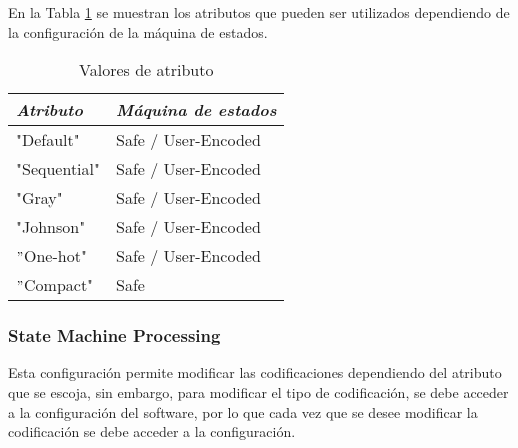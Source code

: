 \documentclass{article}
\begin{document}
En la Tabla \ref{tab:Attribute_Value} se muestran los atributos que pueden ser utilizados dependiendo de la configuración de la máquina de estados.
\begin{table}[h]
    \centering
    \begin{tabular}{|>{\centering\arraybackslash}p{4cm}|>{\centering\arraybackslash}p{4cm}|}
        \hline
        \rule{0pt}{3ex}\textbf{\textit{Atributo}} & \textbf{\textit{Máquina de estados}} \\ \hline
        \rule{0pt}{3 ex}"Default" & Safe / User-Encoded \\ \hline
        \rule{0pt}{3ex}"Sequential" & Safe / User-Encoded \\ \hline
        \rule{0pt}{3 ex}"Gray" & Safe / User-Encoded \\ \hline
        \rule{0pt}{3 ex}"Johnson" & Safe / User-Encoded \\ \hline
        \rule{0pt}{3 ex}$"$One-hot" & Safe / User-Encoded \\ \hline
        \rule{0pt}{3 ex}$"$Compact" & Safe \\ \hline
    \end{tabular}
    \caption{Valores de atributo}
    \label{tab:Attribute_Value}
\end{table}
\subsubsection{State Machine Processing}
Esta configuración permite modificar las codificaciones dependiendo del atributo que se escoja, sin embargo, para modificar el tipo de codificación, se debe acceder a la configuración del software, por lo que cada vez que se desee modificar la codificación se debe acceder a la configuración. 
\end{document}

